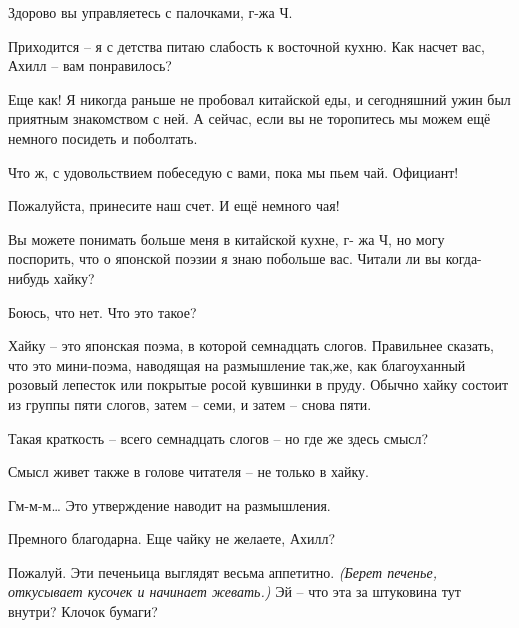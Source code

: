 \documentclass[../main.tex]{subfiles}
\begin{document}


\begin{dialogue}

 Здорово вы управляетесь с палочками, г-жа Ч.

 Приходится \--- я с детства питаю слабость к восточной кухню. Как насчет вас, Ахилл \--- вам понравилось?

 Еще как! Я никогда раньше не пробовал китайской еды, и сегодняшний ужин был приятным знакомством с ней. А сейчас, если вы не торопитесь мы можем ещё немного посидеть и поболтать.

 Что ж, с удовольствием побеседую с вами, пока мы пьем чай. Официант!


Пожалуйста, принесите наш счет. И ещё немного чая!


 Вы можете понимать больше меня в китайской кухне, г- жа Ч, но могу поспорить, что о японской поэзии я знаю побольше вас. Читали ли вы когда-нибудь хайку?

 Боюсь, что нет. Что это такое?

 Хайку \--- это японская поэма, в которой семнадцать слогов. Правильнее сказать, что это мини-поэма, наводящая на размышление так,же, как благоуханный розовый лепесток или покрытые росой кувшинки в пруду. Обычно хайку состоит из группы пяти слогов, затем \--- семи, и затем \--- снова пяти.

 Такая краткость \--- всего семнадцать слогов \--- но где же здесь смысл?

 Смысл живет также в голове читателя \--- не только в хайку.

 Гм-м-м\ldots{} Это утверждение наводит на размышления.


Премного благодарна. Еще чайку не желаете, Ахилл?

 Пожалуй. Эти печеньица выглядят весьма аппетитно. \emph{(Берет печенье, откусывает кусочек и начинает жевать.)} Эй \--- что эта за штуковина тут внутри? Клочок бумаги?


\end{dialogue}
\end{document}
